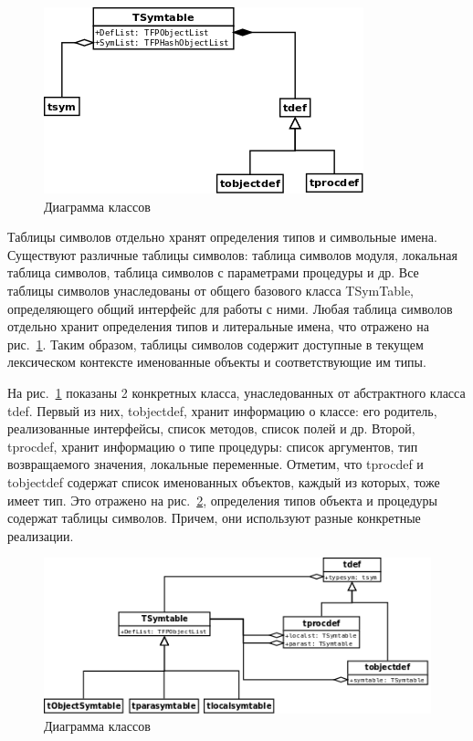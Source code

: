 \documentclass{imcs}
\begin{document}
\begin{figure}[htb]
\centering
\includegraphics{./uml/sym-def-def-inheritence.png}
\caption{Диаграмма классов}
\label{symboltable-sym-def}
\end{figure}

Таблицы символов отдельно хранят определения типов и символьные имена. Существуют 
различные таблицы символов: таблица символов модуля, локальная таблица символов, таблица
символов с параметрами процедуры и др. Все таблицы символов унаследованы от общего
базового класса TSymTable, определяющего общий интерфейс для работы с ними. Любая таблица символов отдельно
хранит определения типов и литеральные имена, что отражено на рис.~\ref{symboltable-sym-def}.
Таким образом, таблицы символов содержит доступные в текущем лексическом контексте
именованные объекты и соответствующие им типы.

На рис.~\ref{symboltable-sym-def} показаны 2 конкретных класса, унаследованных от
абстрактного класса tdef. Первый из них, tobjectdef, хранит информацию о классе: 
его родитель, реализованные интерфейсы, список методов, список полей и др. Второй, tprocdef, хранит
информацию о типе процедуры: список аргументов, тип возвращаемого значения, локальные
переменные. Отметим, что tprocdef и tobjectdef содержат
список именованных объектов, каждый из которых, тоже имеет тип. Это отражено на
рис.~\ref{symtable-def}, определения типов объекта и процедуры содержат таблицы символов. Причем,
они используют разные конкретные реализации.

\begin{figure}[htb]
\centering
\includegraphics{./uml/symtable-def.png}
\caption{Диаграмма классов}
\label{symtable-def}
\end{figure}
\end{document}
